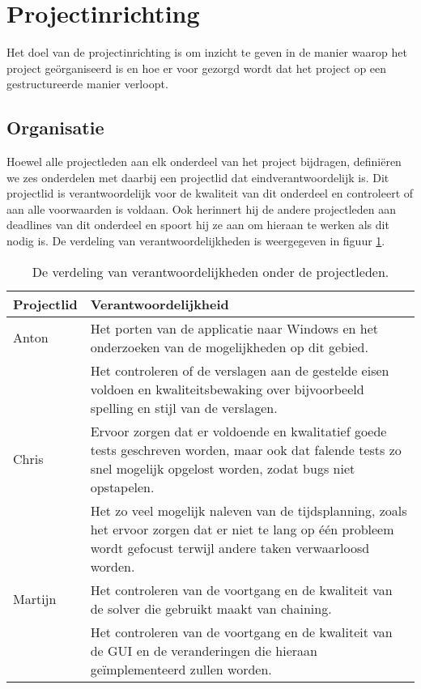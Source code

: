 \section{Projectinrichting}
Het doel van de projectinrichting is om inzicht te geven in de manier waarop het project ge\"organiseerd is en hoe er voor gezorgd wordt dat het project op een gestructureerde manier verloopt.

\subsection{Organisatie}
Hoewel alle projectleden aan elk onderdeel van het project bijdragen, definiëren we zes onderdelen met daarbij een projectlid dat eindverantwoordelijk is. Dit projectlid is verantwoordelijk voor de kwaliteit van dit onderdeel en controleert of aan alle voorwaarden is voldaan. Ook herinnert hij de andere projectleden aan deadlines van dit onderdeel en spoort hij ze aan om hieraan te werken als dit nodig is. De verdeling van verantwoordelijkheden is weergegeven in figuur \ref{fig:organisatie}.

\begin{table}[!h]
\label{fig:organisatie}
\def\arraystretch{1.5}
\begin{tabularx}{\textwidth}{|p{2cm}|X|}
\hline
\textbf{Projectlid} & \textbf{Verantwoordelijkheid} \\ \hline
Anton & Het porten van de applicatie naar Windows en het onderzoeken van de mogelijkheden op dit gebied. \\ \cline{2-2}
& Het controleren of de verslagen aan de gestelde eisen voldoen en kwaliteitsbewaking over bijvoorbeeld spelling en stijl van de verslagen. \\ \hline
Chris & Ervoor zorgen dat er voldoende en kwalitatief goede tests geschreven worden, maar ook dat falende tests zo snel mogelijk opgelost worden, zodat bugs niet opstapelen. \\ \cline{2-2}
& Het zo veel mogelijk naleven van de tijdsplanning, zoals het ervoor zorgen dat er niet te lang op één probleem wordt gefocust terwijl andere taken verwaarloosd worden. \\ \hline
Martijn & Het controleren van de voortgang en de kwaliteit van de solver die gebruikt maakt van chaining. \\ \cline{2-2}
& Het controleren van de voortgang en de kwaliteit van de GUI en de veranderingen die hieraan ge\"implementeerd zullen worden. \\ \hline
\end{tabularx}
\caption{De verdeling van verantwoordelijkheden onder de projectleden.}
\end{table}

